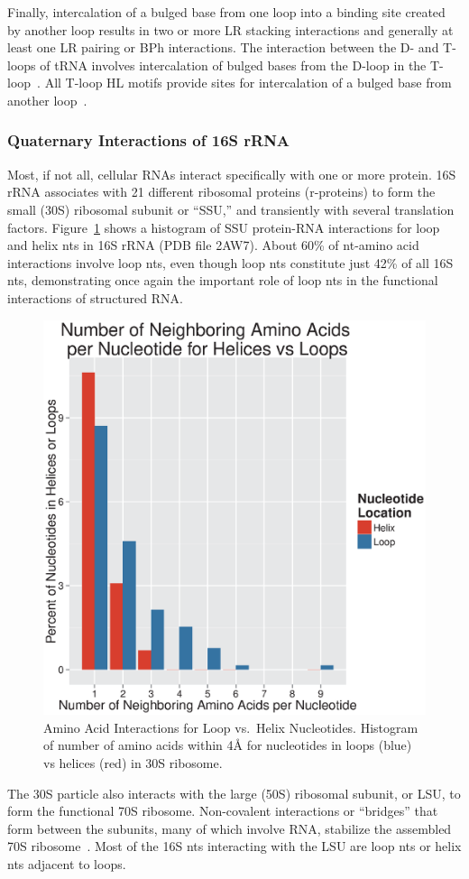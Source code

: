 Finally, intercalation of a bulged base from one loop into a binding site
created by another loop results in two or more LR stacking interactions and
generally at least one LR pairing or BPh interactions. The interaction between
the D- and T-loops of tRNA involves intercalation of bulged bases from the
D-loop in the T-loop~\cite{Quigley1976}. All T-loop HL motifs provide sites for
intercalation of a bulged base from another loop~\cite{Nagaswamy2002}. 

\subsubsection{Quaternary Interactions of 16S rRNA}

Most, if not all, cellular RNAs interact specifically with one or more protein.
\EC{} 16S rRNA associates with 21 different ribosomal proteins (r-proteins) to
form the small (30S) ribosomal subunit or ``SSU,'' and transiently with several
translation factors. Figure~\ref{fig:aa-loop-v-nt} shows a histogram of SSU
protein-RNA interactions for loop and helix nts in 16S rRNA (PDB file 2AW7).
About 60\% of nt-amino acid interactions involve loop nts, even though loop nts
constitute just 42\% of all 16S nts, demonstrating once again the important role
of loop nts in the functional interactions of structured RNA\@.

\begin{figure}
  \includegraphics[width=0.5\linewidth]{chapter-1/figs/aa-loop-v-nt}
  \caption{Amino Acid Interactions for Loop vs.\ Helix Nucleotides. Histogram of
    number of amino acids within 4Å for nucleotides in loops (blue) vs helices
    (red) in \EC{} 30S ribosome. }
\label{fig:aa-loop-v-nt}
\end{figure}

The 30S particle also interacts with the large (50S) ribosomal subunit, or LSU,
to form the functional 70S ribosome. Non-covalent interactions or ``bridges''
that form between the subunits, many of which involve RNA, stabilize the
assembled 70S ribosome~\cite{Yusupov2001}. Most of the 16S nts interacting with
the LSU are loop nts or helix nts adjacent to loops. 

